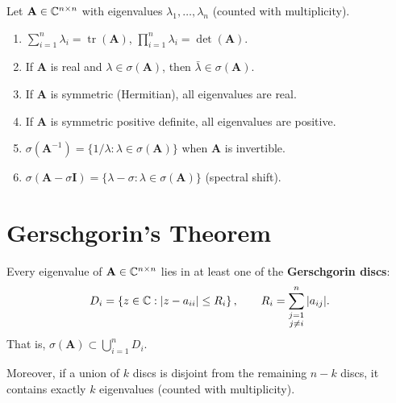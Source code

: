 \begin{proposition}
\label{prop:spectral}
Let $\mathbf{A} \in \mathbb{C}^{n \times n}$ with eigenvalues $\lambda_1, \ldots, \lambda_n$ (counted with multiplicity).
\begin{enumerate}
    \item $\displaystyle\sum_{i=1}^n \lambda_i = \operatorname{tr}(\mathbf{A})$, \qquad $\displaystyle\prod_{i=1}^n \lambda_i = \det(\mathbf{A})$.
    \item If $\mathbf{A}$ is real and $\lambda \in \sigma(\mathbf{A})$, then $\bar{\lambda} \in \sigma(\mathbf{A})$.
    \item If $\mathbf{A}$ is symmetric (Hermitian), all eigenvalues are real.
    \item If $\mathbf{A}$ is symmetric positive definite, all eigenvalues are positive.
    \item $\sigma(\mathbf{A}^{-1}) = \{1/\lambda : \lambda \in \sigma(\mathbf{A})\}$ when $\mathbf{A}$ is invertible.
    \item $\sigma(\mathbf{A} - \sigma\mathbf{I}) = \{\lambda - \sigma : \lambda \in \sigma(\mathbf{A})\}$ (spectral shift).
\end{enumerate}
\end{proposition}

\section{Gerschgorin's Theorem}

\begin{theorem}
\label{thm:gerschgorin}
Every eigenvalue of $\mathbf{A} \in \mathbb{C}^{n \times n}$ lies in at least one of the \textbf{Gerschgorin discs}:
\[
    D_i = \left\{ z \in \mathbb{C} : |z - a_{ii}| \leq R_i \right\}, \qquad R_i = \sum_{\substack{j=1 \\ j \neq i}}^{n} |a_{ij}|.
\]
That is, $\sigma(\mathbf{A}) \subset \bigcup_{i=1}^{n} D_i$.

Moreover, if a union of $k$ discs is disjoint from the remaining $n-k$ discs, it contains exactly $k$ eigenvalues (counted with multiplicity).
\end{theorem}

